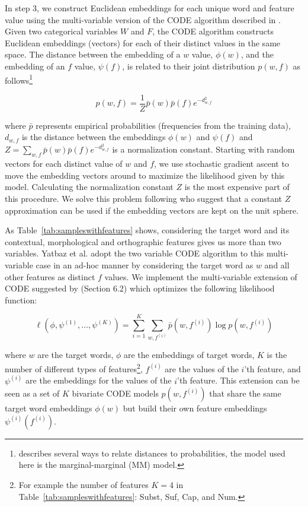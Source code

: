 In step 3, we construct Euclidean embeddings for each unique word and
feature value using the multi-variable version of the CODE algorithm
described in \cite{globerson2007euclidean}.  Given two categorical
variables $W$ and $F$, the CODE algorithm constructs Euclidean
embeddings (vectors) for each of their distinct values in the same
space.  The distance between the embedding of a $w$ value, $\phi(w)$,
and the embedding of an $f$ value, $\psi(f)$, is related to their joint
distribution $p(w, f)$ as
follows\footnote{\cite{globerson2007euclidean} describes several ways
  to relate distances to probabilities, the model used here is the
  marginal-marginal (MM) model.}

\[ p(w,f) = \frac{1}{Z} \bar{p}(w) \bar{p}(f) e^{-d^2_{w,f}} \]

\noindent where $\bar{p}$ represents empirical probabilities
(frequencies from the training data), $d_{w,f}$ is the distance
between the embeddings $\phi(w)$ and $\psi(f)$ and $Z=\sum_{w,f}
\bar{p}(w) \bar{p}(f) e^{-d^2_{w,f}}$ is a normalization constant.
Starting with random vectors for each distinct value of $w$ and $f$,
we use stochastic gradient ascent to move the embedding vectors around
to maximize the likelihood given by this model.  Calculating the
normalization constant $Z$ is the most expensive part of this
procedure.  We solve this problem following \cite{maron2010sphere} who
suggest that a constant $Z$ approximation can be used if the embedding
vectors are kept on the unit sphere.

As Table~\ref{tab:sampleswithfeatures} shows, considering the target
word and its contextual, morphological and orthographic features gives
us more than two variables.  Yatbaz et al. 
 adopt the two
variable CODE algorithm to this multi-variable case in an ad-hoc
manner by considering the target word as $w$ and all other features as
distinct $f$ values.  We implement the multi-variable extension of
CODE suggested by \cite{globerson2007euclidean} (Section 6.2) which
optimizes the following likelihood function:

\[ \ell(\phi, \psi^{(1)}, \ldots, \psi^{(K)}) = 
    \sum_{i=1}^K \sum_{w,f^{(i)}} \bar{p}(w,f^{(i)}) \log p(w,f^{(i)}) \]

\noindent where $w$ are the target words, $\phi$ are the embeddings of
target words, $K$ is the number of different types of
features\footnote{For example the number of features $K=4$ in
  Table~\ref{tab:sampleswithfeatures}: Subst, Suf, Cap, and Num.},
$f^{(i)}$ are the values of the $i$'th feature, and $\psi^{(i)}$ are
the embeddings for the values of the $i$'th feature.  This extension
can be seen as a set of $K$ bivariate CODE models $p(w,f^{(i)})$ that
share the same target word embeddings $\phi(w)$ but build their own
feature embeddings $\psi^{(i)}(f^{(i)})$.

